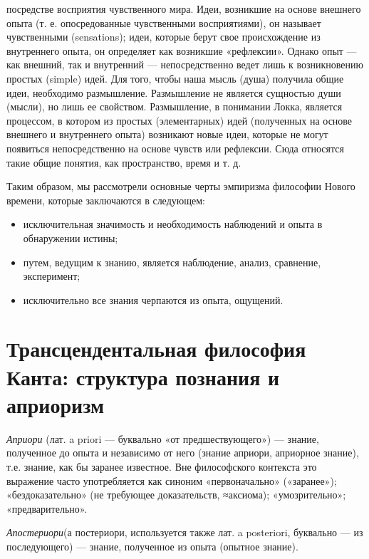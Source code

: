 \documentclass[12pt]{article}
\begin{document}
посредстве восприятия чувственного мира. Идеи, возникшие на основе внешнего опыта (т. е. опосредованные
чувственными восприятиями), он называет чувственными (sensations); идеи, которые берут свое происхождение
из  внутреннего  опыта,  он  определяет  как  возникшие  «рефлексии».  Однако  опыт  —  как  внешний,  так  и
внутренний — непосредственно ведет лишь к возникновению простых (simple) идей. Для того, чтобы наша
мысль (душа) получила общие идеи, необходимо размышление. Размышление не является сущностью души
(мысли), но лишь ее свойством.
Размышление,  в  понимании  Локка,  является  процессом,  в  котором  из  простых  (элементарных)  идей
(полученных на основе внешнего и внутреннего опыта) возникают новые идеи, которые не могут появиться
непосредственно на основе чувств или рефлексии. Сюда относятся такие общие понятия, как пространство,
время и т. д.

Таким образом, мы рассмотрели основные черты эмпиризма философии Нового времени, которые заключаются
в следующем:
\begin{itemize}
\item исключительная значимость и необходимость наблюдений и опыта в обнаружении истины;
\item путем, ведущим к знанию, является наблюдение, анализ, сравнение, эксперимент;
\item исключительно все знания черпаются из опыта, ощущений.
\end{itemize}


\newpage
\section{Трансцендентальная философия Канта: структура познания и априоризм}
\textit{Априори} (лат. a priori — буквально «от предшествующего»)
--- знание, полученное до опыта и независимо от него (знание априори, априорное знание),
т.е. знание, как бы заранее известное.
Вне философского контекста это выражение часто употребляется как синоним «первоначально» («заранее»);
«бездоказательно» (не требующее доказательств, ≈аксиома); «умозрительно»; «предварительно».

\textit{Апостериори}(а постериори, используется также лат. a posteriori, буквально — из последующего)
--- знание, полученное из опыта (опытное знание).
\end{document}
